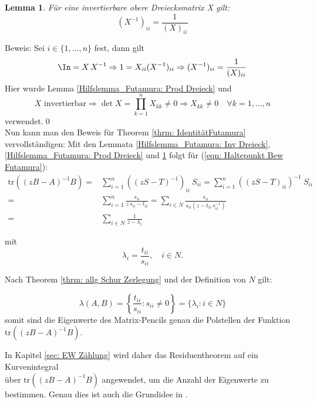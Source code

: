 \documentclass[a4paper,12pt]{report}
\newcommand{\tr}{\text{tr}}
\newcommand{\inv}{^{-1}}
\newcommand{\1}{\mathds{1}}
\theoremstyle{plain} %
\newtheorem{lemma}[theorem]{Lemma}  %
\theoremstyle{definition} %
\theoremstyle{remark}
\begin{document}
            \begin{lemma}
                  \label{Hilfslemma_Futamura: Diag Inv Dreieck}
                  Für eine invertierbare obere Dreiecksmatrix X gilt:
                  $$(X\inv)_{ii} = \frac 1 {(X)_{ii}}$$
            \end{lemma}
            Beweis: Sei $i\in\{1,\dots,n\}$ fest, dann gilt
            $$\In = X\,X\inv \Rightarrow 1 = X_{ii}(X\inv)_{ii} \Rightarrow (X\inv)_{ii} = \frac 1 {(X)_{ii}}$$
            Hier wurde Lemma \ref{Hilfslemma_Futamura: Prod Dreieck} und
            $$X \text{ invertierbar}\Rightarrow \det X = \prod_{k=1}^{n}X_{kk}\ne 0\Rightarrow X_{kk}\ne 0\quad \forall k=1,\dots,n$$
            verwendet.\qed\\

            Nun kann man den Beweis für Theorem \ref{thrm: IdentitätFutamura} vervollständigen:
            Mit den Lemmata \ref{Hilfslemma_Futamura: Inv Dreieck}, \ref{Hilfslemma_Futamura: Prod Dreieck} und \ref{Hilfslemma_Futamura: Diag Inv Dreieck} folgt für (\ref{eqn: Haltepunkt Bew Futamura}):
            \begin{align*}
                  \tr((zB-A)\inv B) =& \sum_{i=1}^{n}((zS-T)\inv)_{ii}\ S_{ii} = \sum_{i=1}^{n}((zS-T)_{ii})\inv\ S_{ii}\\
                  =& \sum_{i=1}^{n}\frac{s_{ii}}{z\,s_{ii}-t_{ii}} = \sum_{i\in N}\frac{s_{ii}}{s_{ii}(z-t_{ii}\, s_{ii}\inv)}\\
                  =& \sum_{i\in N} \frac{1}{z-\lambda_i}
            \end{align*}

            mit
            $$\lambda_i = \frac{t_{ii}}{s_{ii}},\quad i\in N.$$

            Nach Theorem \ref{thrm: allg Schur Zerlegung} und der Definition von $N$ gilt:

            $$\lambda(A, B) = \left\{\frac{t_{ii}}{s_{ii}} : s_{ii}\ne 0\right\} = \{\lambda_i: i\in N\}$$
            somit sind die Eigenwerte des Matrix-Pencils genau die Polstellen der Funktion $\tr((zB-A)\inv B)$.

            In Kapitel \ref{sec: EW Zählung} wird daher das Residuentheorem auf ein Kurvenintegral\\
            über $\tr((zB-A)\inv B)$ angewendet, um die Anzahl der Eigenwerte zu bestimmen.
            Genau dies ist auch die Grundidee in \cite{grundlageFutamura,hauptteilTkachuk}.

            
\end{document}
